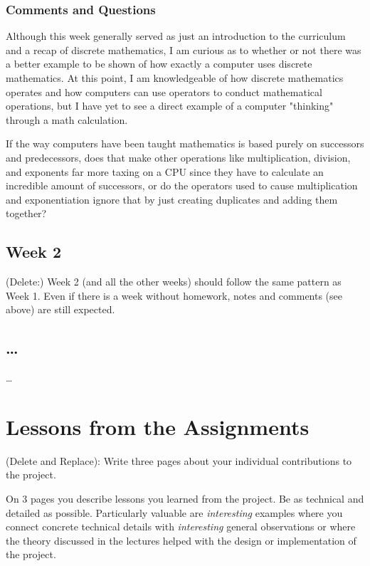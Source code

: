 \documentclass{article}
\theoremstyle{theorem}
\theoremstyle{definition}
\theoremstyle{remark}
\begin{document}
\subsubsection*{Comments and Questions}

Although this week generally served as just an introduction to the curriculum and a recap of discrete mathematics, I am curious as to whether or not there was a better example to be shown of how exactly a computer uses discrete mathematics. At this point, I am knowledgeable of how discrete mathematics operates and how computers can use operators to conduct mathematical operations, but I have yet to see a direct example of a computer "thinking" through a math calculation.

If the way computers have been taught mathematics is based purely on successors and predecessors, does that make other operations like multiplication, division, and exponents far more taxing on a CPU since they have to calculate an incredible amount of successors, or do the operators used to cause multiplication and exponentiation ignore that by just creating duplicates and adding them together?


\subsection{Week 2}

(Delete:) Week 2 (and all the other weeks) should follow the same pattern as Week 1. Even if there is a week without homework, notes and comments (see above) are still expected.

\subsection{\ldots}

\ldots

\section{Lessons from the Assignments}

(Delete and Replace): Write three pages about your individual contributions to the project.

On 3 pages you describe lessons you learned from the project. Be as technical and detailed as possible. Particularly valuable are \emph{interesting} examples where you connect concrete technical details with \emph{interesting} general observations or where the theory discussed in the lectures helped with the design or implementation of the project.
\end{document}
